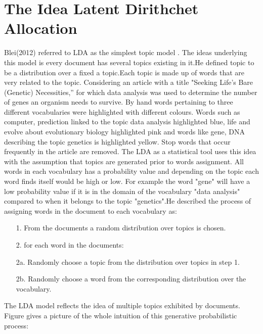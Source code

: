 \section{ The Idea Latent Dirithchet Allocation}
 Blei(2012) referred to LDA as the simplest topic model . The ideas underlying this model is every document has several topics existing in it.He defined topic to be a distribution over a fixed a topic.Each topic is made up of words that are very related to the topic. Considering an article with a title "Seeking Life’s Bare (Genetic) Necessities,” for which data analysis was used to determine the number of genes an organism needs to survive. By hand words pertaining to three different vocabularies were highlighted with different colours. Words such as computer, prediction linked to the topic data analysis highlighted blue, life and evolve about evolutionary biology highlighted pink and words like gene, DNA describing the topic genetics is highlighted yellow. Stop words that occur frequently in the article are removed. 
The LDA as a statistical tool uses this idea with the assumption that topics are generated prior to words assignment. All words in each vocabulary has a probability value and depending on the topic each word finds itself would be high or low. For example the word "gene" will have a low probability value if it is in the domain of the  vocabulary "data analysis" compared to when it belongs to the topic "genetics".He described the process of assigning words in the document to each 
vocabulary as:
\begin{itemize}
\item[1.] From the documents a random distribution over topics is chosen.
\item[2.] for each word in the documents:
		\item[2a.]Randomly choose a topic from
the distribution over topics in step 1.
		\item[2b.]Randomly choose a word from the
corresponding distribution over
the vocabulary.
\end{itemize}
The LDA model reflects the idea of multiple topics exhibited by documents.
Figure  gives a picture of the whole intuition of this generative probabilistic process:

